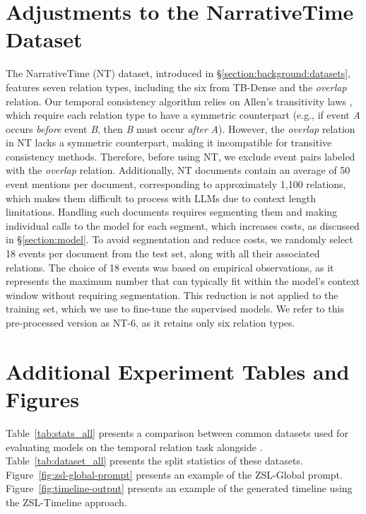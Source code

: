 \section{Adjustments to the NarrativeTime Dataset}
\label{append:nt-further-details}
The NarrativeTime (NT) dataset, introduced in §\ref{section:background:datasets}, features seven relation types, including the six from TB-Dense and the \textit{overlap} relation. Our temporal consistency algorithm relies on Allen’s transitivity laws \cite{ALLEN1984123}, which require each relation type to have a symmetric counterpart (e.g., if event \textit{A} occurs \textit{before} event \textit{B}, then \textit{B} must occur \textit{after} \textit{A}). However, the \textit{overlap} relation in NT lacks a symmetric counterpart, making it incompatible for transitive consistency methods. 
Therefore, before using NT, we exclude event pairs labeled with the \textit{overlap} relation.
Additionally, NT documents contain an average of 50 event mentions per document, corresponding to approximately 1,100 relations, which makes them difficult to process with LLMs due to context length limitations. Handling such documents requires segmenting them and making individual calls to the model for each segment, which increases costs, as discussed in §\ref{section:model}. To avoid segmentation and reduce costs, we randomly select 18 events per document from the test set, along with all their associated relations. The choice of 18 events was based on empirical observations, as it represents the maximum number that can typically fit within the model's context window without requiring segmentation. This reduction is not applied to the training set, which we use to fine-tune the supervised models. We refer to this pre-processed version as NT-6, as it retains only six relation types.


\section{Additional Experiment Tables and Figures}
\label{append:additional-figures}
Table~\ref{tab:stats_all} presents a comparison between common datasets used for evaluating models on the temporal relation task alongside \App{}. Table~\ref{tab:dataset_all} presents the split statistics of these datasets. Figure~\ref{fig:zsl-global-prompt} presents an example of the ZSL-Global prompt. Figure~\ref{fig:timeline-output} presents an example of the generated timeline using the ZSL-Timeline approach.


